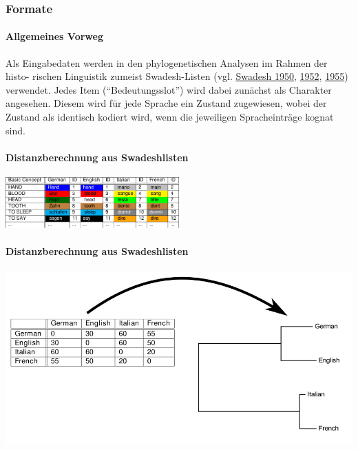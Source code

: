 \subsubsection{Formate}

\paragraph{Allgemeines Vorweg}

Als Eingabedaten werden in den phylogenetischen Analysen im Rahmen der
histo- rischen Linguistik zumeist Swadesh-Listen (vgl.
\href{http://bibliography.lingpy.org?key=Swadesh1950}{Swadesh 1950},
\href{http://bibliography.lingpy.org?key=Swadesh1952}{1952},
\href{http://bibliography.lingpy.org?key=Swadesh1955}{1955}) verwendet.
Jedes Item (``Bedeutungsslot'') wird dabei zunächst als Charakter
angesehen. Diesem wird für jede Sprache ein Zustand zugewiesen, wobei
der Zustand als identisch kodiert wird, wenn die jeweiligen
Spracheinträge kognat sind.





\paragraph{Distanzberechnung aus Swadeshlisten}

\begin{center}
\includegraphics[width=0.5\textwidth]{img/cognates-1.pdf}
\end{center}




\paragraph{Distanzberechnung aus Swadeshlisten}

\begin{center}
\includegraphics[width=\textwidth]{img/distance-tree.png}
\end{center}




